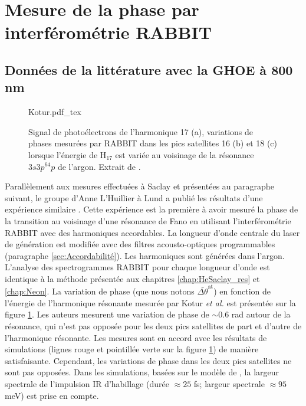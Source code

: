 \section{Mesure de la phase par interférométrie RABBIT}
\label{sec:ArRABBIT}
\subsection{Données de la littérature avec la GHOE à 800 nm}
\begin{figure}[ht]
\centering
\def\svgwidth{0.5\textwidth}
{Kotur.pdf_tex}
\caption{Signal de photoélectrons de l'harmonique 17 (a), variations de phases mesurées par RABBIT dans les pics satellites 16 (b) et 18 (c) lorsque l'énergie de H$_{17}$ est variée au voisinage de la résonance $3s3p^64p$ de l'argon. Extrait de .}
\label{fig:Kotur}
\end{figure}

Parallèlement aux mesures effectuées à Saclay et présentées au paragraphe suivant, le groupe d'Anne L'Huillier à Lund a publié les résultats d'une expérience similaire . Cette expérience est la première à avoir mesuré la phase de la transition au voisinage d'une résonance de Fano en utilisant l'interférométrie RABBIT avec des harmoniques accordables. La longueur d'onde centrale du laser de génération est modifiée avec des filtres acousto-optiques programmables (paragraphe \ref{sec:Accordabilité}). Les harmoniques sont générées dans l'argon. L'analyse des spectrogrammes RABBIT pour chaque longueur d'onde est identique à la méthode présentée aux chapitres \ref{chap:HeSaclay_res} et \ref{chap:Neon}. La variation de phase (que nous notons $\bar{\Delta \theta}^{\text{at}}$) en fonction de l'énergie de l'harmonique résonante mesurée par Kotur \textit{et al.} est présentée sur la figure \ref{fig:Kotur}. Les auteurs mesurent une variation de phase de $\sim 0.6$ rad autour de la résonance, qui n'est pas opposée pour les deux pics satellites de part et d'autre de l'harmonique résonante. Les mesures sont en accord avec les résultats de simulations (lignes rouge et pointillée verte sur la figure \ref{fig:Kotur}) de manière satisfaisante. Cependant, les variations de phase dans les deux pics satellites ne sont pas opposées. Dans les simulations, basées sur le modèle de , la largeur spectrale de l'impulsion IR d'habillage (durée $\approx 25$ fs; largeur spectrale $\approx 95$ meV) est prise en compte.


